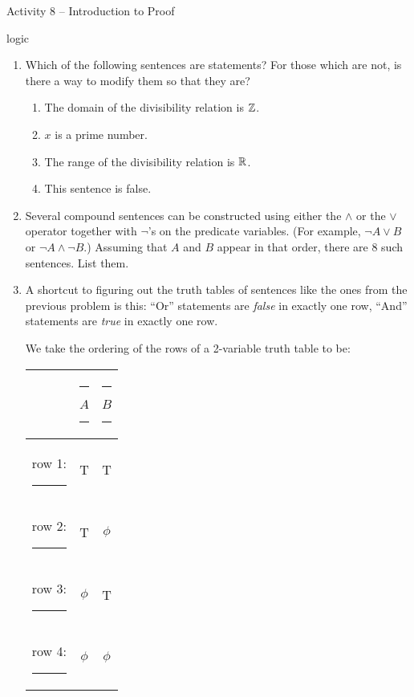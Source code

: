 \documentclass{amsart}
\begin{document}
\thispagestyle{empty}

\centerline{\Large Activity 8 -- Introduction to Proof}
\centerline{\large logic}

\bigskip
\Large


\begin{enumerate}
\item Which of the following sentences are statements?  For those which are not, is there a way to modify them so that they are?

\begin{enumerate}
\item The domain of the divisibility relation is ${\mathbb Z}$.
\item $x$ is a prime number.
\item The range of the divisibility relation is ${\mathbb R}$.
\item This sentence is false.
\end{enumerate}

\vspace{.2in}

\item Several compound sentences can be constructed using either the $\land$ or the $\lor$ operator together with $\lnot$'s on the predicate variables.  (For example, $\lnot A \lor B$ or $\lnot A \land \lnot B$.)  Assuming that $A$ and $B$ appear in that order, there are 8 such sentences. 
List them.

\vfill

\newpage

\item A shortcut to figuring out the truth tables of sentences like the ones from the previous problem is this:  ``Or'' statements are {\em false} in exactly one row,  ``And'' statements are 
{\em true} in exactly one row.  

We take the ordering of the rows of a 2-variable truth table to be:

\begin{center}
\begin{tabular}{r|c|c}
 & \rule{12pt}{0pt} $A$ \rule{12pt}{0pt} & \rule{12pt}{0pt} $B$ \rule{12pt}{0pt} \\ \hline
row 1: \rule{12pt}{0pt} & T & T \\
row 2: \rule{12pt}{0pt} & T & $\phi$ \\
row 3: \rule{12pt}{0pt} &  $\phi$ & T \\
row 4: \rule{12pt}{0pt} &  $\phi$ &  $\phi$ \\
\end{tabular}
\end{center}


\end{enumerate}
\end{document}
